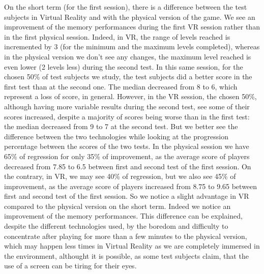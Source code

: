 \documentclass[12pt, openany, twocolumn]{article}
\begin{document}
    On the short term (for the first session), there is a difference between the test subjects in Virtual Reality and with the physical version of the game.
    We see an improvement of the memory performances during the first VR session rather than in the first physical session. Indeed, in VR, the range of levels reached is incremented by 3 (for the minimum and the maximum levels completed), whereas in the physical version we don't see any changes, the maximum level reached is even lower (2 levels less) during the second test. 
    In this same session, for the chosen 50\% of test subjects we study, the test subjects did a better score in the first test than at the second one. The median decreased from 8 to 6, which represent a loss of score, in general.
    However, in the VR session, the chosen 50\%, although having more variable results during the second test, see some of their scores increased, despite a majority of scores being worse than in the first test: the median decreased from 9 to 7 at the second test. 
    But we better see the difference between the two technologies while looking at the progression percentage between the scores of the two tests. In the physical session we have 65\% of regression for only 35\% of improvement, as the average score of players decreased from 7.85 to 6.5 between first and second test of the first session.
    On the contrary, in VR, we may see 40\% of regression, but we also see 45\% of improvement, as the average score of players increased from 8.75 to 9.65 between first and second test of the first session.
    So we notice a slight advantage in VR compared to the physical version on the short term. Indeed we notice an improvement of the memory performances.
    This difference can be explained, despite the different technologies used, by the boredom and difficulty to concentrate after playing for more than a few minutes to the physical version, which may happen less times in Virtual Reality as we are completely immersed in the environment, althought it is possible, as some test subjects claim, that the use of a screen can be tiring for their eyes. 
    \\
    
\end{document}
